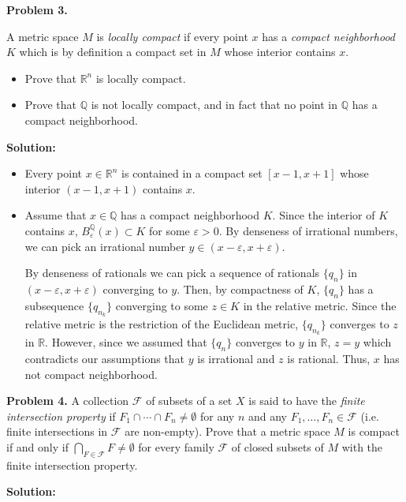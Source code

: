 \documentclass[12pt]{article}
\def\black{\color{black}}
\def\green{\color{rltgreen}}
\newcommand\bi{\begin{itemize}}
\newcommand\ei{\end{itemize}}
\newcommand\itema{\item[(a)]}
\newcommand\itemb{\item[(b)]}
\renewcommand\|{\ | \ }
\newcommand\mc\mathcal
\newcommand\Q{\mathbb{Q}}
\newcommand\R{\mathbb{R}}
\def\pb#1{{\green \bf Problem #1.}\hskip 8pt \black}
\def\sol{\textbf{Solution:}}
\def\sequence#1{$\{{#1}_n\}$}
\def\subsequence#1{$\{{#1}_{n_k}\}$}
\newcommand\e\varepsilon
\begin{document}

\pb{3}

A metric space $M$ is \emph{locally compact} if every point $x$ has a 
\emph{compact neighborhood} $K$ which is by definition a compact set in $M$
whose interior contains $x$.

\bi
\itema
Prove that $\R^n$ is locally compact.
\itemb
Prove that $\Q$ is not locally compact, and in fact that no point in $\Q$ has
a compact neighborhood.
\ei

\sol

\bi
\itema
Every point $x \in \R^n$ is contained in a compact set $[x - 1, x + 1]$ whose
interior $(x - 1, x + 1)$ contains $x$.
\itemb
Assume that $x \in \Q$ has a compact neighborhood $K$. Since the interior of 
$K$ contains $x$, $B_{\e}^{\Q}(x) \subset K$ for some $\e > 0$. By denseness of
irrational numbers, we can pick an irrational number $y \in (x - \e, x + \e)$. 

By denseness of rationals we can pick a sequence of rationals 
\sequence q in $(x - \e, x + \e)$ converging to $y$. Then, by compactness
of $K$, \sequence q has a subsequence \subsequence q converging to some 
$z \in K$ in the relative metric. Since the relative metric is the restriction
of the Euclidean metric, \subsequence q converges to $z$ in $\R$. However,
since we assumed that \sequence q converges to $y$ in $\R$, 
$z = y$ which contradicts our assumptions that $y$ is irrational
and $z$ is rational. Thus, $x$ has not compact neighborhood.
\ei


\pb{4}
A collection $\mc F$ of subsets of a set $X$ is said to have the
\emph{finite intersection property} if 
$F_1 \cap \cdots \cap F_n \neq \emptyset$
for any $n$ and any $F_1, \ldots, F_n \in \mc F$ (i.e. finite intersections
in $\mc F$ are non-empty). Prove that a metric space $M$ is compact if and
only if $\bigcap_{F \in \mc F} F \neq \emptyset$ for every family $\mc F$ of 
closed subsets of $M$ with the finite intersection property.

\sol
\end{document}
